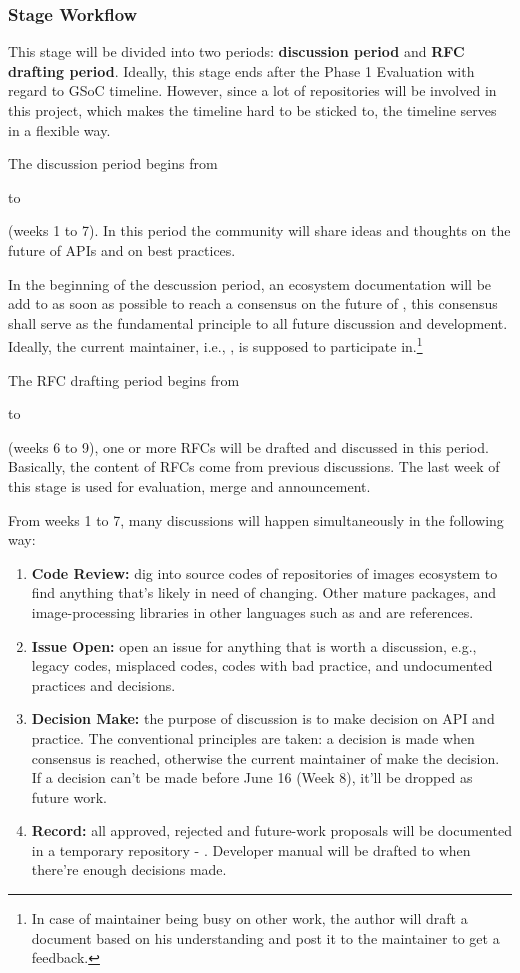 \subsubsection*{Stage Workflow}

This stage will be divided into two periods: \textbf{discussion period} and \textbf{RFC drafting period}. Ideally, this stage ends after the \textsf{Phase 1 Evaluation} with regard to GSoC timeline. However, since a lot of repositories will be involved in this project, which makes the timeline hard to be sticked to, the timeline serves in a flexible way.\par

The discussion period begins from \date{April 22} to \date{June 9} (weeks 1 to 7). In this period the community will share ideas and thoughts on the future of APIs and on best practices.\par

In the beginning of the descussion period, an ecosystem documentation will be add to \repoimagesgithubio{} as soon as possible to reach a consensus on the future of \images{}, this consensus shall serve as the fundamental principle to all future discussion and development. Ideally, the current \images{} maintainer, i.e., \timholy, is supposed to participate in.\footnote{In case of maintainer being busy on other work, the author will draft a document based on his understanding and post it to the maintainer to get a feedback.}\par

The RFC drafting period begins from \date{May 27} to \date{June 23} (weeks 6 to 9), one or more RFCs will be drafted and discussed in this period. Basically, the content of RFCs come from previous discussions. The last week of this stage is used for evaluation, merge and announcement.\par

From weeks 1 to 7, many discussions will happen simultaneously in the following way:
\begin{enumerate}
    \item \textbf{Code Review:} dig into source codes of repositories of images ecosystem to find anything that's likely in need of changing. Other mature \langjulia{} packages, and image-processing libraries in other languages such as \reposcikitimage{} and \matlabimageprocessing{} are references.
    \item \textbf{Issue Open:} open an issue for anything that is worth a discussion, e.g., legacy codes, misplaced codes, codes with bad practice, and undocumented practices and decisions.
    \item \textbf{Decision Make:} the purpose of discussion is to make decision on API and practice. The conventional principles are taken: a decision is made when consensus is reached, otherwise the current maintainer of \images{} make the decision. If a decision can't be made before June 16 (Week 8), it'll be dropped as future work.
    \item \textbf{Record:} all approved, rejected and future-work proposals will be documented in a temporary repository - \repogsoctempdoc{}. Developer manual will be drafted to \repoimagesgithubio{} when there're enough decisions made.
\end{enumerate}

